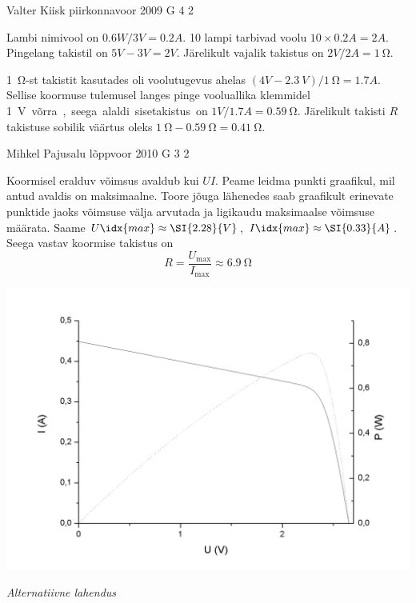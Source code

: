 \documentclass[11pt]{article}
\begin{document}
{%
{Valter Kiisk} %
{piirkonnavoor} %
{2009} %
{G 4} %
{2} %
{

\ifSolution
\osa Lambi nimivool on $\SI{0,6}W/\SI{3}V=\SI{0,2}A$. 10
lampi tarbivad voolu $10\times \SI{0,2}A=\SI{2}A$. Pingelang takistil on $\SI{5}V-\SI{3}V=\SI{2}V$. Järelikult vajalik takistus on $\SI{2}V/\SI{2}A=\SI{1}{\ohm}$.

\osa \SI{1}{\ohm}-st takistit kasutades oli voolutugevus ahelas $(\SI{4}V-\SI{2,3}{V})/\SI{1}{\ohm}=\SI{1,7}A$. Sellise koormuse tulemusel langes pinge vooluallika
klemmidel \SI{1}V võrra, seega alaldi sisetakistus on $\SI{1}V/\SI{1,7}A=\SI{0,59}{\ohm}$. Järelikult takisti $R$ takistuse sobilik väärtus oleks
$\SI{1}{\ohm}-\SI{0,59}{\ohm}=\SI{0,41}{\ohm}$.
\fi
}

{Mihkel Pajusalu} %
{lõppvoor} %
{2010} %
{G 3} %
{2} %
{

\ifSolution
Koormisel eralduv võimsus avaldub kui $UI$. Peame leidma punkti graafikul, mil antud avaldis on maksimaalne. Toore jõuga lähenedes saab graafikult erinevate punktide jaoks võimsuse välja arvutada ja ligikaudu maksimaalse võimsuse määrata. Saame $U\idx{max} \approx \SI{2.28}{V}$, $I\idx{max}\approx \SI{0.33}{A}$. Seega vastav koormise takistus on
\[
R = \frac{U_\mathrm{max}}{I_\mathrm{max}} \approx \SI{6.9}{\ohm}
\]


\begin{center}
	\vspace{-0.1cm}
	\includegraphics[width=0.8\linewidth]{2010-v3g-03-paneel_lah.png}
\end{center}

\textit{Alternatiivne lahendus}\\

}}
\end{document}
